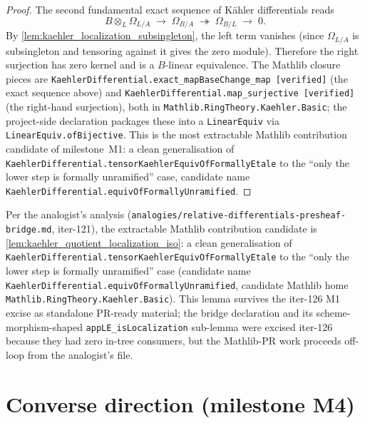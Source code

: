 \begin{proof}
  
  \leanok
  The second fundamental exact sequence of K\"ahler differentials reads
  \[
    B \otimes_{L} \Omega_{L/A} \;\longrightarrow\; \Omega_{B/A} \;\twoheadrightarrow\; \Omega_{B/L} \;\longrightarrow\; 0.
  \]
  By \cref{lem:kaehler_localization_subsingleton}, the left term vanishes (since \(\Omega_{L/A}\) is subsingleton and tensoring against it gives the zero module). Therefore the right surjection has zero kernel and is a \(B\)-linear equivalence. The Mathlib closure pieces are \texttt{KaehlerDifferential.exact\_mapBaseChange\_map}~\texttt{[verified]} (the exact sequence above) and \texttt{KaehlerDifferential.map\_surjective}~\texttt{[verified]} (the right-hand surjection), both in \texttt{Mathlib.RingTheory.Kaehler.Basic}; the project-side declaration packages these into a \texttt{LinearEquiv} via \texttt{LinearEquiv.ofBijective}. This is the most extractable Mathlib contribution candidate of milestone~M1: a clean generalisation of \texttt{KaehlerDifferential.tensorKaehlerEquivOfFormallyEtale} to the ``only the lower step is formally unramified'' case, candidate name \texttt{KaehlerDifferential.equivOfFormallyUnramified}.
\end{proof}

\begin{remark}
  \label{rem:bridge_mathlib_pr}
  Per the analogist's analysis (\texttt{analogies/relative-differentials-presheaf-bridge.md}, iter-121), the extractable Mathlib contribution candidate is \cref{lem:kaehler_quotient_localization_iso}: a clean generalisation of \texttt{KaehlerDifferential.tensorKaehlerEquivOfFormallyEtale} to the ``only the lower step is formally unramified'' case (candidate name \texttt{KaehlerDifferential.equivOfFormallyUnramified}, candidate Mathlib home \texttt{Mathlib.RingTheory.Kaehler.Basic}). This lemma survives the iter-126 M1 excise as standalone PR-ready material; the bridge declaration and its scheme-morphism-shaped \texttt{appLE\_isLocalization} sub-lemma were excised iter-126 because they had zero in-tree consumers, but the Mathlib-PR work proceeds off-loop from the analogist's file.
\end{remark}

\section{Converse direction (milestone M4)}
\label{sec:converse-out-of-scope}

